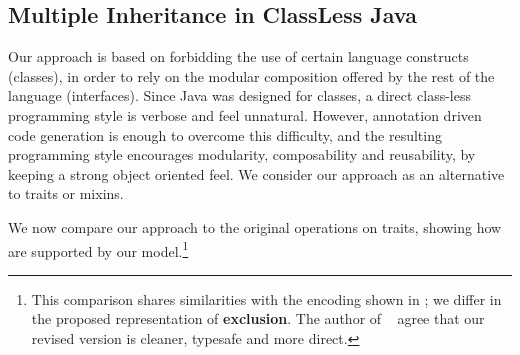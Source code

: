 \subsection{Multiple Inheritance in ClassLess Java}
\begin{comment}
Haoyuan

   - vs both: we do automatic return type refinement, which has useful applications
   (example: Expression Problem)

   - vs traits: we support of methods to create new objects (a replacement to constructors);
   Moreover we have the with and clone methods (we miss more applications for those). Show
   how to model the operations on traits; discuss operations that we cannot model
   (example: renaming).

   - vs mixins: we use the trait model of explicitly resolving conflicts. This is arguably
   better for reasoning.
\end{comment}

Our approach is based on forbidding the use of certain language constructs (classes), in order to rely on the modular composition offered by the rest of the language (interfaces).
Since Java was designed for classes, a direct class-less programming style is verbose and feel unnatural. However, annotation driven code generation is enough to overcome this difficulty, and
the resulting programming style encourages modularity, composability and reusability, by keeping a strong object oriented feel.
We consider our approach as an alternative to traits or mixins.

We now compare our approach to the original operations on traits, showing how are supported by our model.\footnote{This comparison shares  similarities with the encoding shown in \cite{bono14};
we differ in the 
proposed representation of
 \textbf{exclusion}.
The author of ~\cite{bono14} agree that our revised version is cleaner, typesafe and more direct.
}

